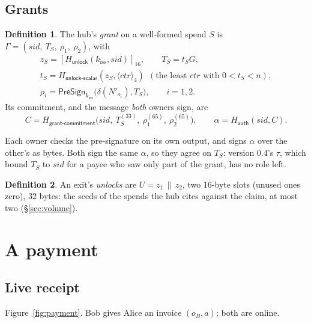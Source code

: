 \documentclass[11pt]{article}
\theoremstyle{plain}
\theoremstyle{definition}
\newtheorem{definition}{Definition}
\newcommand{\be}[2]{\langle #1\rangle_{#2}}
\newcommand{\pre}[2]{[#1]_{#2}}
\newcommand{\Ht}[1]{H_{\textsf{#1}}}
\newcommand{\PSign}{\mathsf{PreSign}}
\newcommand{\kiss}{k_{\mathrm{iss}}}
\newcommand{\sid}{\mathit{sid}}
\begin{document}
\subsection{Grants}\label{sec:grant}

\begin{definition}
The hub's \emph{grant} on a well-formed spend $S$ is $\Gamma = (\sid,\
T_S,\ \rho_1,\ \rho_2)$, with
\begin{gather*}
  z_S = \pre{\Ht{unlock}(\kiss, \sid)}{16},\qquad T_S = t_S G,\\
  t_S = \Ht{unlock-scalar}(z_S, \be{\mathit{ctr}}{4})\ \ (\text{the least
  } \mathit{ctr} \text{ with } 0 < t_S < n),\\
  \rho_i = \PSign_{\kiss}\big(\delta(N'_{o_i}), T_S\big),\qquad i = 1, 2.
\end{gather*}
Its commitment, and the message \emph{both} owners sign, are
\[
  C = \Ht{grant-commitment}\big(\sid,\ T_S^{(33)},\ \rho_1^{(65)},\
  \rho_2^{(65)}\big),\qquad \alpha = \Ht{auth}(\sid, C).
\]
\end{definition}

Each owner checks the pre-signature on its own output, and signs
$\alpha$ over the other's as bytes. Both sign the same $\alpha$, so they
agree on $T_S$: version 0.4's $\tau$, which bound $T_S$ to $\sid$ for a
payee who saw only part of the grant, has no role left.

\begin{definition}
An exit's \emph{unlocks} are $U = z_1 \,\|\, z_2$, two 16-byte slots
(unused ones zero), 32 bytes: the seeds of the spends the hub cites
against the claim, at most two (\S\ref{sec:volume}).
\end{definition}

\section{A payment}\label{sec:payment}

\subsection{Live receipt}\label{sec:live}

Figure~\ref{fig:payment}. Bob gives Alice an invoice $(o_B, a)$; both
are online.
\end{document}
